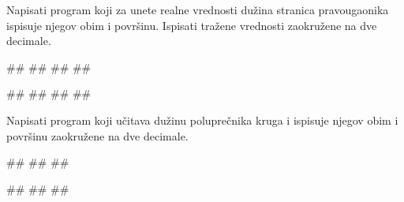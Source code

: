 \begin{Exercise}[label=p1.1_02] 
Napisati program koji za unete realne vrednosti dužina stranica pravougaonika ispisuje njegov obim i površinu. Ispisati tražene vrednosti zaokružene na dve decimale.

\begin{miditest}
\begin{upotreba}{1}
#\naslovInt#
##
##
##
\end{upotreba}
\end{miditest}
\begin{miditest}
\begin{upotreba}{2}
#\naslovInt#
##
##
##
\end{upotreba}
\end{miditest}

\end{Exercise}
\begin{Answer}[ref=p1.1_02]
\end{Answer}

\begin{Exercise}[label=v1.1_04] 
Napisati program koji učitava dužinu poluprečnika kruga
   i ispisuje njegov obim i površinu zaokružene na dve decimale. 
   
\begin{miditest}
\begin{upotreba}{1}
#\naslovInt#
##
##
\end{upotreba}
\end{miditest}
\begin{miditest}
\begin{upotreba}{2}
#\naslovInt#
##
##
\end{upotreba}
\end{miditest}   
   
\end{Exercise}
\begin{Answer}[ref=v1.1_04]
\end{Answer}

